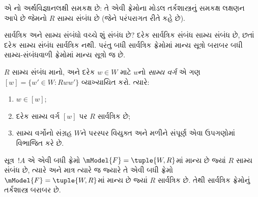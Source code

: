  એ નો
અર્થવિજ્ઞાનલક્ષી સમકક્ષ છે: તે એવી ફ્રેમોના મોડલ
તર્કશાસ્ત્રનું સમકક્ષ લક્ષણન આપે છે જેમનો $R$
સામ્ય સંબંધ છે (જેને પરંપરાગત રીતે  કહે છે).

સાર્વત્રિક અને સામ્ય સંબંધો વચ્ચે શું સંબંધ છે?
દરેક સાર્વત્રિક સંબંધ સામ્ય સંબંધ છે, છતાં દરેક
સામ્ય સંબંધ સાર્વત્રિક નથી. પરંતુ બધી સાર્વત્રિક
ફ્રેમોમાં માન્ય સૂત્રો બરાબર બધી સામ્ય-સંબંધવાળી
ફ્રેમોમાં માન્ય સૂત્રો જ છે.

\begin{prop}
  $R$ સામ્ય સંબંધ માનો, અને દરેક $w \in W$ માટે
  $w$નો \emph{સામ્ય વર્ગ} એ ગણ $[w] = \{w'\in W :
  Rww'\}$ વ્યાખ્યાયિત કરો. ત્યારે:
  \begin{enumerate}
  \item $w \in [w]$;
  \item દરેક સામ્ય વર્ગ $[w]$ પર $R$ સાર્વત્રિક છે;
  \item સામ્ય વર્ગોનો સંગ્રહ $W$ને પરસ્પર વિયુક્ત
    અને મળીને સંપૂર્ણ એવા ઉપગણોમાં વિભાજિત કરે છે.
  \end{enumerate}
\end{prop}

\begin{prop}
  સૂત્ર~$!A$ એ એવી બધી ફ્રેમો
  $\mModel{F} =\tuple{W,R}$માં માન્ય છે જ્યાં $R$
  સામ્ય સંબંધ છે, ત્યારે અને માત્ર ત્યારે જ જ્યારે
  તે એવી બધી ફ્રેમો $\mModel{F} =\tuple{W,R}$માં
  માન્ય છે જ્યાં $R$ સાર્વત્રિક છે. તેથી સાર્વત્રિક
  ફ્રેમોનું તર્કશાસ્ત્ર બરાબર  છે.
\end{prop}

